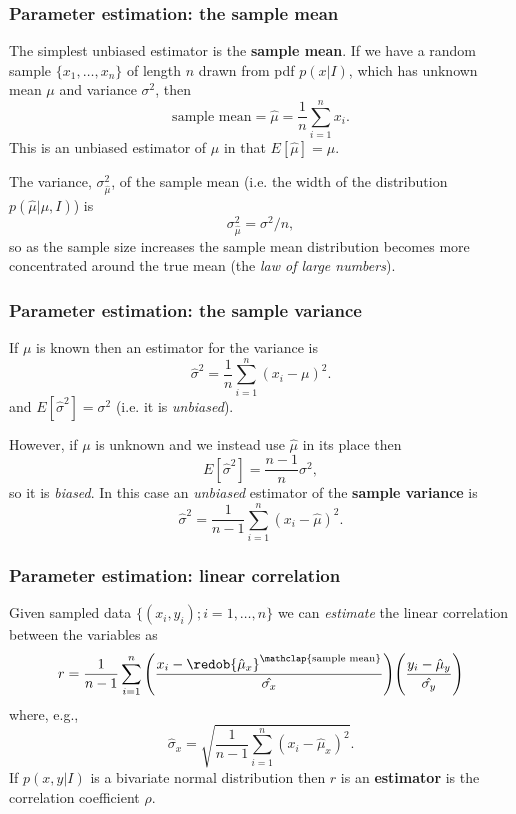 \begin{frame}
\begin{columns}
\begin{column}{0.45\textwidth}
\end{column}
\end{columns}

\end{frame}

\begin{frame}

\frametitle{Parameter estimation: the sample mean}
\label{parameterestimation:thesamplemean}

The simplest unbiased estimator is the \textbf{sample mean}. If we have a random sample $\{x_1,\ldots,x_n\}$ of length
$n$ drawn from pdf $p(x|I)$, which has unknown mean $\mu$ and variance $\sigma^2$, then
\[
\text{sample mean}=\hat{\mu} = \frac{1}{n}\sum_{i=1}^n x_i.
\]
This is an unbiased estimator of $\mu$ in that $E[\hat{\mu}] = \mu$.

The variance, $\sigma_{\hat{\mu}}^2$, of the sample mean (i.e. the width of the distribution $p(\hat{\mu}|\mu,I)$)
is
\[
\sigma_{\hat{\mu}}^2 = \sigma^2/n,
\]
so as the sample size increases the sample mean distribution becomes more concentrated around the
true mean (the \emph{law of large numbers}).

\end{frame}

\begin{frame}

\frametitle{Parameter estimation: the sample variance}
\label{parameterestimation:thesamplevariance}

If $\mu$ is known then an estimator for the variance is
\[
\hat{\sigma}^2 = \frac{1}{n}\sum_{i=1}^n (x_i-\mu)^2.
\]
and $E[\hat{\sigma}^2] = \sigma^2$ (i.e. it is \emph{unbiased}).

However, if $\mu$ is unknown and we instead use $\hat{\mu}$ in its place then
\[
E[\hat{\sigma}^2] = \frac{n-1}{n}\sigma^2,
\]
so it is \emph{biased}. In this case an \emph{unbiased} estimator of the \textbf{sample variance} is
\[
\hat{\sigma}^2 = \frac{1}{n-1}\sum_{i=1}^n (x_i-\hat{\mu})^2.
\]

\end{frame}

\begin{frame}

\frametitle{Parameter estimation: linear correlation}
\label{parameterestimation:linearcorrelation}

Given sampled data $\{(x_i, y_i); i=1,\ldots,n\}$ we can \emph{estimate} the linear correlation between the
variables as
\[
r = \frac{1}{n-1}\sum_{i=1}^n\Bigg(\frac{x_i-\redob{\hat{\mu}_x}^{\mathclap{\text{sample mean}}}}{\hat{\sigma_x}}\Bigg)
\Bigg(\frac{y_i-\hat{\mu}_y}{\hat{\sigma_y}}\Bigg)
\]
where, e.g.,
\[
\hat{\sigma}_x = \sqrt{\frac{1}{n-1}\sum_{i=1}^n (x_i-\hat{\mu}_x)^2 }.
\]
If $p(x,y|I)$ is a bivariate normal distribution then $r$ is an \textbf{estimator} is the correlation coefficient $\rho$.

\end{frame}

